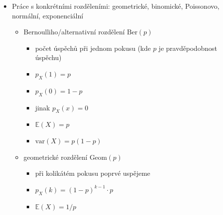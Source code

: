 \begin{itemize}
\begin{itemize}
\begin{itemize}
\end{itemize}
\item kovariance a její vlastnosti
\begin{itemize}
\item definice: $\text{cov}(X,Y)=\mathbb E((X-\mathbb EX)(Y-\mathbb EY))$
\item věta: $\text{cov}(X,Y)=\mathbb E(XY)-\mathbb E(X)\mathbb E(Y)$
\item pro nezávislé $X,Y$ platí $\text{cov}(X,Y)=0$
\item zjevně $\text{cov}(X,X)=\text{var}(X)$
\item $\text{cov}(aX+bY,Z)=a\text{cov}(X,Z)+b\text{cov}(Y,Z)$
\item korelace
\begin{itemize}
\item $\rho(X,Y)=\frac{\text{cov}(X,Y)}{\sigma_X\cdot\sigma_Y}$
\end{itemize}
\end{itemize}
\item rozptyl součtu náhodných veličin (závislých i nezávislých)
\begin{itemize}
\item nechť $X=\sum_{i=1}^n X_i$
\item pak $\text{var}(X)=\sum_{i=1}^n\sum_{j=1}^n\text{cov}(X_i,X_j)$
\end{itemize}
\end{itemize}
\item Práce s konkrétními rozděleními: geometrické, binomické, Poissonovo, normální, exponenciální
\begin{itemize}
\item Bernoulliho/alternativní rozdělení $\text{Ber}(p)$
\begin{itemize}
\item počet úspěchů při jednom pokusu (kde $p$ je pravděpodobnost úspěchu)
\item $p_X(1)=p$
\item $p_X(0)=1-p$
\item jinak $p_X(x)=0$
\item $\mathbb E(X)=p$
\item $\text{var}(X)=p(1-p)$
\end{itemize}
\item geometrické rozdělení $\text{Geom}(p)$
\begin{itemize}
\item při kolikátém pokusu poprvé uspějeme
\item $p_X(k)=(1-p)^{k-1}\cdot p$
\item $\mathbb E(X)=1/p$

\end{itemize}
\end{itemize}
\end{itemize}
